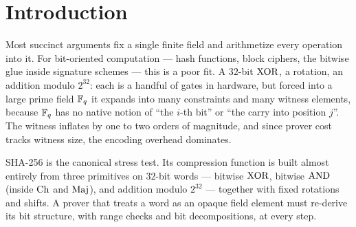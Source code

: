 \section{Introduction}
\label{sec:intro}

Most succinct arguments fix a single finite field and arithmetize every
operation into it. For bit-oriented computation --- hash functions, block
ciphers, the bitwise glue inside signature schemes --- this is a poor fit. A
$32$-bit $\operatorname{XOR}$, a rotation, an addition modulo $2^{32}$: each is a handful of
gates in hardware, but forced into a large prime field $\mathbb{F}_q$ it expands into
many constraints and many witness elements, because $\mathbb{F}_q$ has no native
notion of ``the $i$-th bit'' or ``the carry into position $j$''. The witness
inflates by one to two orders of magnitude, and since prover cost tracks
witness size, the encoding overhead dominates.

SHA-256 is the canonical stress test. Its compression function is built almost
entirely from three primitives on $32$-bit words --- bitwise $\operatorname{XOR}$, bitwise
$\operatorname{AND}$ (inside $\operatorname{Ch}$ and $\operatorname{Maj}$), and addition modulo $2^{32}$ --- together
with fixed rotations and shifts. A prover that treats a word as an opaque field
element must re-derive its bit structure, with range checks and bit
decompositions, at every step.

